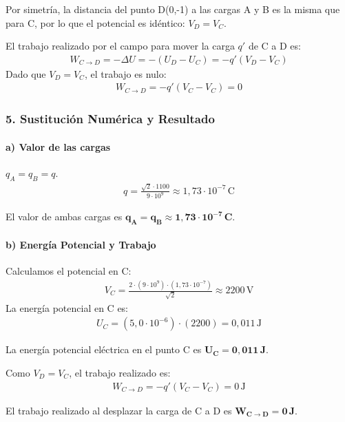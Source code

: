 \medskip
Por simetría, la distancia del punto D(0,-1) a las cargas A y B es la misma que para C, por lo que el potencial es idéntico: $V_D = V_C$.

\medskip
El trabajo realizado por el campo para mover la carga $q'$ de C a D es:
\begin{gather*}
    W_{C \to D} = - \Delta U = -(U_D - U_C) = -q'(V_D - V_C)
\end{gather*}
Dado que $V_D = V_C$, el trabajo es nulo:
\begin{gather*}
    W_{C \to D} = -q'(V_C - V_C) = 0
\end{gather*}
\subsubsection*{5. Sustitución Numérica y Resultado}
\paragraph*{a) Valor de las cargas}
$q_A = q_B = q$.
\begin{gather}
    q = \frac{\sqrt{2} \cdot 1100}{9 \cdot 10^9} \approx 1,73 \cdot 10^{-7} \, \text{C}
\end{gather}
\begin{cajaresultado}
    El valor de ambas cargas es $\boldsymbol{q_A = q_B \approx 1,73 \cdot 10^{-7} \, C}$.
\end{cajaresultado}
\paragraph*{b) Energía Potencial y Trabajo}
Calculamos el potencial en C:
\begin{gather}
    V_C = \frac{2 \cdot (9 \cdot 10^9) \cdot (1,73 \cdot 10^{-7})}{\sqrt{2}} \approx 2200 \, \text{V}
\end{gather}
La energía potencial en C es:
\begin{gather}
    U_C = (5,0 \cdot 10^{-6}) \cdot (2200) = 0,011 \, \text{J}
\end{gather}
\begin{cajaresultado}
    La energía potencial eléctrica en el punto C es $\boldsymbol{U_C = 0,011 \, J}$.
\end{cajaresultado}
\medskip
Como $V_D = V_C$, el trabajo realizado es:
\begin{gather}
    W_{C \to D} = -q'(V_C - V_C) = 0 \, \text{J}
\end{gather}
\begin{cajaresultado}
    El trabajo realizado al desplazar la carga de C a D es $\boldsymbol{W_{C \to D} = 0 \, J}$.
\end{cajaresultado}

